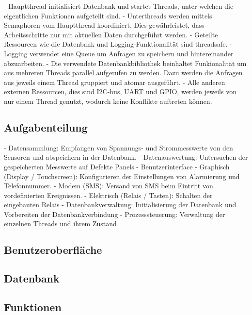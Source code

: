  - Hauptthread initialisiert Datenbank und startet Threads, unter welchen die eigentlichen Funktionen aufgeteilt sind.
 - Unterthreads werden mittels Semaphoren vom Hauptthread koordiniert. Dies gewährleistet, dass Arbeitsschritte nur mit aktuellen Daten durchgeführt werden.
 - Geteilte Ressourcen wie die Datenbank und Logging-Funktionalität sind threadsafe.
    - Logging verwendet eine Queue um Anfragen zu speichern und hintereinander abzuarbeiten.
    - Die verwendete Datenbankbibliothek beinhaltet Funkionalität um aus mehreren Threads parallel aufgerufen zu werden. Dazu werden die Anfragen aus jeweils einem Thread gruppiert und atomar ausgeführt.
 - Alle anderen externen Ressourcen, dies sind I2C-bus, UART und GPIO, werden jeweils von nur einem Thread genutzt, wodurch keine Konflikte auftreten können.


\subsection{Aufgabenteilung}
\label{subsec:software:master:taskSeparation}

 - Datensammlung: Empfangen von Spannungs- und Strommesswerte von den Sensoren und abspeichern in der Datenbank.
 - Datenauswertung: Untersuchen der gespeicherten Messwerte auf Defekte Panels
 - Benutzerinterface
   - Graphisch (Display / Touchscreen): Konfigurieren der Einstellungen von Alarmierung und Telefonnummer.
   - Modem (SMS): Versand von SMS beim Eintritt von vordefinierten Ereignissen.
   - Elektrisch (Relais / Tasten): Schalten der eingebauten Relais
 - Datenbankverwaltung: Initialisierung der Datenbank und Vorbereiten der Datenbankverbindung
 - Prozesssteuerung: Verwaltung der einzelnen Threads und ihrem Zustand


\subsection{Benutzeroberfl\"ache}
\label{subsec:software:master:GUI}

\subsection{Datenbank}
\label{subsec:software:master:database}

\subsection{Funktionen}
\label{subsec:software:master:functions}
